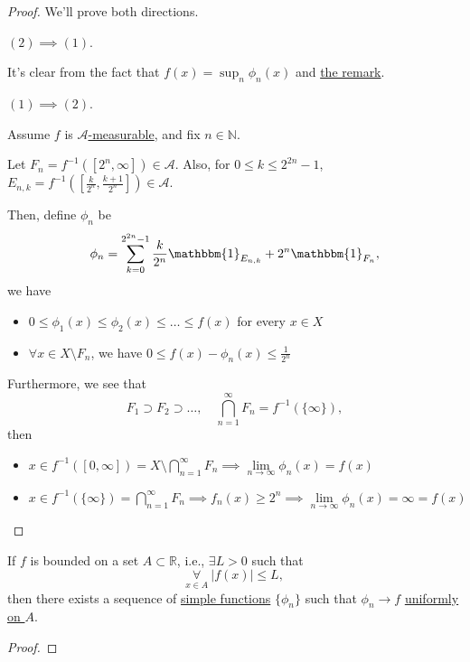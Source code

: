 \begin{proof}
	We'll prove both directions.
	\begin{claim}
		\((2)\implies (1)\).
	\end{claim}
	\begin{explanation}
		It's clear from the fact that \(f(x) = \sup_n \phi _{n}(x)\) and \hyperref[rmk:Operations-preserve-measurability]{the remark}.
	\end{explanation}

	\begin{claim}
		\((1)\implies (2)\).
	\end{claim}
	\begin{explanation}
		Assume \(f\) is \hyperref[def:A-measurable-function]{\(\mathcal{A} \)-measurable}, and fix \(n\in\mathbb{N} \).

		\par Let \(F_{n} =f^{-1} ([2^n, \infty ])\in \mathcal{A}\). Also, for \(0\leq k\leq 2^{2n}-1\), \(E_{n, k} = f^{-1} \left(\left[\frac{k}{2^n}, \frac{k+1}{2^n}\right]\right)\in \mathcal{A} \).

		\par Then, define \(\phi _{n}\) be
		\[
			\phi _{n} = \sum\limits_{k=0}^{2^{2n} - 1}\frac{k}{2^n}\mathbbm{1}_{E_{n, k}}  + 2^n \mathbbm{1}_{F_n},
		\]
		we have
		\begin{itemize}
			\item \(0\leq \phi _1(x)\leq \phi _2(x)\leq \dots \leq f(x) \) for every \(x\in X\)
			\item \(\forall x\in X\setminus F_{n}\), we have \(0\leq f(x) - \phi _{n}(x)\leq \frac{1}{2^n}\)
		\end{itemize}

		\par Furthermore, we see that
		\[
			F_1\supset F_2\supset \dots ,\quad \bigcap\limits_{n=1}^{\infty} F_{n} = f^{-1} (\{\infty \}),
		\]
		then
		\begin{itemize}
			\item \(x\in f^{-1} ([0, \infty ]) = X\setminus \bigcap\limits_{n=1}^{\infty} F_{n} \implies \lim\limits_{n \to \infty} \phi _{n}(x) = f(x)\)
			\item \(x\in f^{-1} (\{\infty \}) = \bigcap\limits_{n=1}^{\infty} F_{n}\implies f_{n}(x)\geq 2^n \implies \lim\limits_{n \to \infty} \phi _{n}(x) = \infty = f(x)\)
		\end{itemize}
	\end{explanation}
\end{proof}

\begin{corollary}
	If \(f\) is bounded on a set \(A\subset \mathbb{R} \), i.e., \(\exists L > 0 \) such that
	\[
		\underset{x\in A}{\forall }\ \left\vert f(x) \right\vert \leq L,
	\]
	then there exists a sequence of \hyperref[def:simple-function]{simple functions} \(\{\phi _{n}\}\) such that \(\phi _{n}\to f \)
	\underline{\hyperref[def:uniformly-convergence]{uniformly} on \(A\)}.
\end{corollary}
\begin{proof}
\end{proof}

